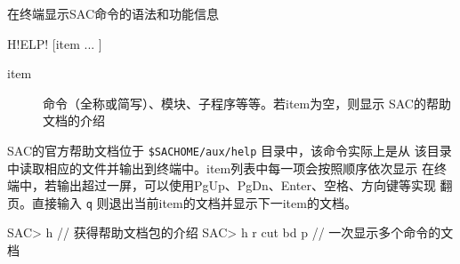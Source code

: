\label{cmd:help}

在终端显示SAC命令的语法和功能信息

\begin{SACSTX}
H!ELP! [item ... ]
\end{SACSTX}

\begin{description}
\item [item] 命令（全称或简写）、模块、子程序等等。若item为空，则显示
    SAC的帮助文档的介绍
\end{description}

SAC的官方帮助文档位于 \verb|$SACHOME/aux/help| 目录中，该命令实际上是从
该目录中读取相应的文件并输出到终端中。item列表中每一项会按照顺序依次显示
在终端中，若输出超过一屏，可以使用PgUp、PgDn、Enter、空格、方向键等实现
翻页。直接输入 \texttt{q} 则退出当前item的文档并显示下一item的文档。

\begin{SACCode}
SAC> h                  // 获得帮助文档包的介绍
SAC> h r cut bd p       // 一次显示多个命令的文档
\end{SACCode}
